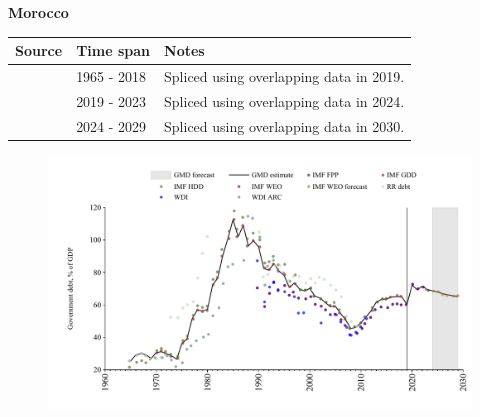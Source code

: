 \documentclass[12pt,a4paper,landscape]{article}
\begin{document}
\begin{adjustbox}{max totalsize={\paperwidth}{\paperheight},center}
\begin{minipage}[t][\textheight][t]{\textwidth}
\vspace*{0.5cm}
{}
\begin{center}
{\Large\bfseries Morocco}
\end{center}
\vspace{0.5cm}
\begin{table}[H]
\centering
\small
\begin{tabular}{|l|l|l|}
\hline
\textbf{Source} & \textbf{Time span} & \textbf{Notes} \\
\hline
\rowcolor{white}\cite{IMF_GDD}& 1965 - 2018 &Spliced using overlapping data in 2019.\\
\rowcolor{lightgray}\cite{IMF_FPP}& 2019 - 2023 &Spliced using overlapping data in 2024.\\
\rowcolor{white}\cite{IMF_WEO_forecast}& 2024 - 2029 &Spliced using overlapping data in 2030.\\
\hline
\end{tabular}
\end{table}
\begin{figure}[H]
\centering
\includegraphics[width=\textwidth,height=0.6\textheight,keepaspectratio]{graphs/MAR_govdebt_GDP.pdf}
\end{figure}
\end{minipage}
\end{adjustbox}
\end{document}
